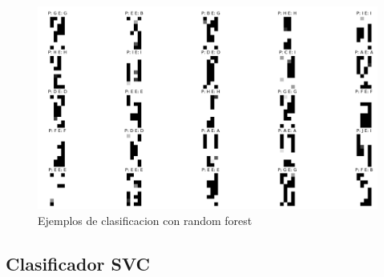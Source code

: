 \documentclass[8pt,a4paper]{{esannV2}}
\begin{document}
\begin{enumerate}
\begin{figure}[h!]
\centering
    \includegraphics[scale=0.15]{./RandomForest_9_4.png}
    \caption{Ejemplos de clasificacion con random forest}
\end{figure}
\end{enumerate}
\newpage
\subsection{Clasificador SVC}
\end{document}

